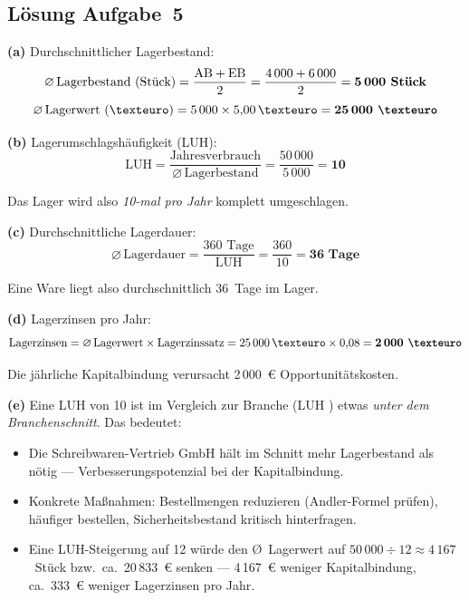 \documentclass[11pt, a4paper]{article}
\begin{document}
\subsection*{Lösung Aufgabe~5}
\begin{loesung}
\textbf{(a)} Durchschnittlicher Lagerbestand:
$$\varnothing\,\text{Lagerbestand (Stück)} = \frac{\text{AB} + \text{EB}}{2} = \frac{4\,000 + 6\,000}{2} = \textbf{5\,000 Stück}$$
$$\varnothing\,\text{Lagerwert (€)} = 5\,000 \times 5{,}00\,€ = \textbf{25\,000 €}$$

\textbf{(b)} Lagerumschlagshäufigkeit (LUH):
$$\text{LUH} = \frac{\text{Jahresverbrauch}}{\varnothing\,\text{Lagerbestand}} = \frac{50\,000}{5\,000} = \textbf{10}$$

Das Lager wird also \emph{10-mal pro Jahr} komplett umgeschlagen.

\textbf{(c)} Durchschnittliche Lagerdauer:
$$\varnothing\,\text{Lagerdauer} = \frac{360 \text{ Tage}}{\text{LUH}} = \frac{360}{10} = \textbf{36 Tage}$$

Eine Ware liegt also durchschnittlich 36~Tage im Lager.

\textbf{(d)} Lagerzinsen pro Jahr:
$$\text{Lagerzinsen} = \varnothing\,\text{Lagerwert} \times \text{Lagerzinssatz} = 25\,000\,€ \times 0{,}08 = \textbf{2\,000 €}$$

Die jährliche Kapitalbindung verursacht 2\,000~€ Opportunitätskosten.

\textbf{(e)} Eine LUH von 10 ist im Vergleich zur Branche (LUH ) etwas
\emph{unter dem Branchenschnitt}. Das bedeutet:
\begin{itemize}[itemsep=0pt]
  \item Die Schreibwaren-Vertrieb GmbH hält im Schnitt mehr Lagerbestand als nötig --- Verbesserungspotenzial bei der Kapitalbindung.
  \item Konkrete Maßnahmen: Bestellmengen reduzieren (Andler-Formel prüfen), häufiger bestellen, Sicherheitsbestand kritisch hinterfragen.
  \item Eine LUH-Steigerung auf 12 würde den Ø~Lagerwert auf $50\,000 \div 12 \approx 4\,167$~Stück bzw.\ ca.\ 20\,833~€ senken --- 4\,167~€ weniger Kapitalbindung, ca.\ 333~€ weniger Lagerzinsen pro Jahr.
\end{itemize}
\end{loesung}
\end{document}
